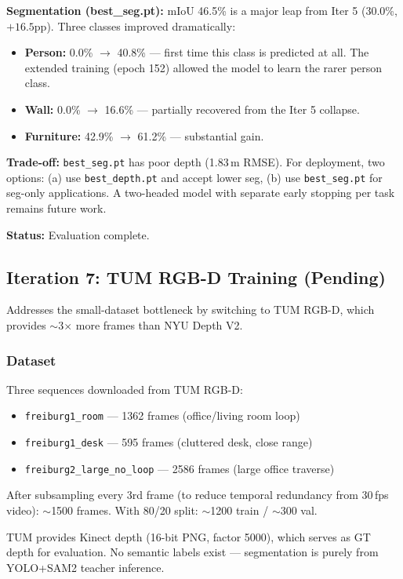 \documentclass[11pt,a4paper]{article}
\begin{document}
\textbf{Segmentation (best\_seg.pt):} mIoU 46.5\% is a major leap from
Iter 5 (30.0\%, $+16.5$pp). Three classes improved dramatically:
\begin{itemize}[nosep]
  \item \textbf{Person:} 0.0\% $\to$ 40.8\% --- first time this class
    is predicted at all. The extended training (epoch 152) allowed the
    model to learn the rarer person class.
  \item \textbf{Wall:} 0.0\% $\to$ 16.6\% --- partially recovered from
    the Iter 5 collapse.
  \item \textbf{Furniture:} 42.9\% $\to$ 61.2\% --- substantial gain.
\end{itemize}

\textbf{Trade-off:} \texttt{best\_seg.pt} has poor depth (1.83\,m RMSE).
For deployment, two options: (a) use \texttt{best\_depth.pt} and accept
lower seg, (b) use \texttt{best\_seg.pt} for seg-only applications.
A two-headed model with separate early stopping per task remains
future work.

\textbf{Status:} Evaluation complete.

\subsection{Iteration 7: TUM RGB-D Training (Pending)}

Addresses the small-dataset bottleneck by switching to TUM RGB-D, which
provides $\sim$3$\times$ more frames than NYU Depth V2.

\subsubsection{Dataset}

Three sequences downloaded from TUM RGB-D:
\begin{itemize}[nosep]
  \item \texttt{freiburg1\_room} --- 1362 frames (office/living room loop)
  \item \texttt{freiburg1\_desk} --- 595 frames (cluttered desk, close range)
  \item \texttt{freiburg2\_large\_no\_loop} --- 2586 frames (large office traverse)
\end{itemize}

After subsampling every 3rd frame (to reduce temporal redundancy from
30\,fps video): $\sim$1500 frames. With 80/20 split: $\sim$1200 train /
$\sim$300 val.

TUM provides Kinect depth (16-bit PNG, factor 5000), which serves as GT
depth for evaluation. No semantic labels exist --- segmentation is
purely from YOLO+SAM2 teacher inference.
\end{document}
